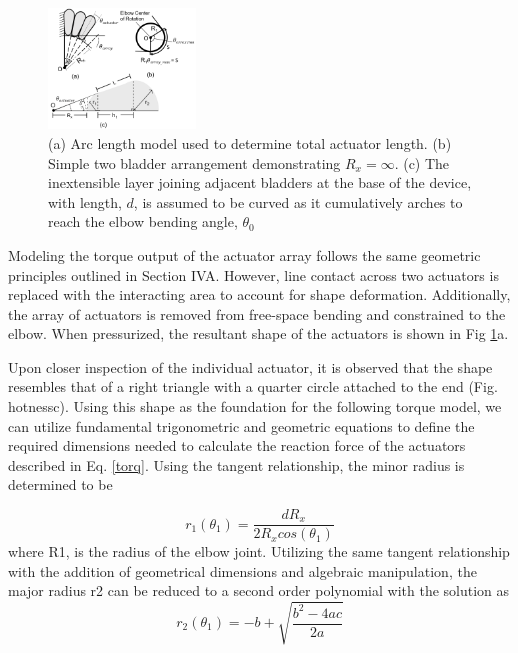 

\begin{figure}[t!]
\centering
\includegraphics[width=0.35\textwidth]{model3.PNG}
\caption{(a) Arc length model used to determine total actuator length. (b) Simple two bladder arrangement demonstrating $R_x = \infty$. (c) The inextensible layer joining adjacent bladders at the base of the device, with length, $d$, is assumed to be curved as it cumulatively arches to reach the elbow bending angle, $\theta_0$ }
\label{fig:hotness}
\end{figure}

Modeling the torque output of the actuator array follows the same geometric principles outlined in Section IVA. However, line contact across two actuators is replaced with the interacting area to account for shape deformation. Additionally, the array of actuators is removed from free-space bending and constrained to the elbow.  When pressurized, the resultant shape of the actuators is shown in Fig \ref{fig:hotness}a.  

 Upon closer inspection of the individual actuator, it is observed that the shape resembles that of a right triangle with a quarter circle attached to the end (Fig. {hotness}c).  Using this shape as the foundation for the following torque model, we can utilize fundamental trigonometric and geometric equations to define the required dimensions needed to calculate the reaction force of the actuators described in Eq. \ref{torq}. Using the tangent relationship, the minor radius is determined to be 
 

\begin{equation}\label{r1}
	r_1(\theta_1)  = \frac{dR_x}{2R_xcos(\theta_1)}
\end{equation}
 where R1, is the radius of the elbow joint. Utilizing the same tangent relationship with the addition of geometrical dimensions and algebraic manipulation, the major radius r2 can be reduced to a second order polynomial with the solution as
 \begin{equation}\label{r2}
	r_2(\theta_1)  = -b + \sqrt{\frac{b^2-4ac}{2a}}
\end{equation}


